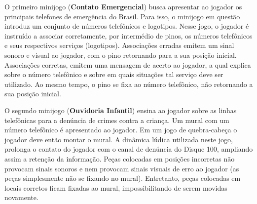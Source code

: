 O primeiro minijogo (\textbf{Contato Emergencial}) busca apresentar ao jogador os principais telefones de emergência do Brasil. Para isso, o minijogo em questão introduz um conjunto de números telefônicos e logotipos. Nesse jogo, o jogador é instruído a associar corretamente, por intermédio de pinos, os números telefônicos e seus respectivos serviços (logotipos). Associações erradas emitem um sinal sonoro e visual ao jogador, com o pino retornando para a sua posição inicial. Associações corretas, emitem uma mensagem de acerto ao jogador, a qual explica sobre o número telefônico e sobre em quais situações tal serviço deve ser utilizado. Ao mesmo tempo, o pino se fixa ao número telefônico, não retornando a sua posição inicial.


O segundo minijogo (\textbf{Ouvidoria Infantil}) ensina ao jogador sobre as linhas telefônicas para a denúncia de crimes contra a criança. Um mural com um número telefônico é apresentado ao jogador. %
Em um jogo de quebra-cabeça o jogador deve então montar o mural. A dinâmica lúdica utilizada neste jogo, prolonga o contato do jogador com o canal de denúncia do Disque 100, ampliando assim a retenção da informação. Peças colocadas em posições incorretas não provocam sinais sonoros e nem provocam sinais visuais de erro ao jogador (as peças simplesmente não se fixando no mural). Entretanto, peças colocadas em locais corretos ficam fixadas ao mural, impossibilitando de serem movidas novamente. 


